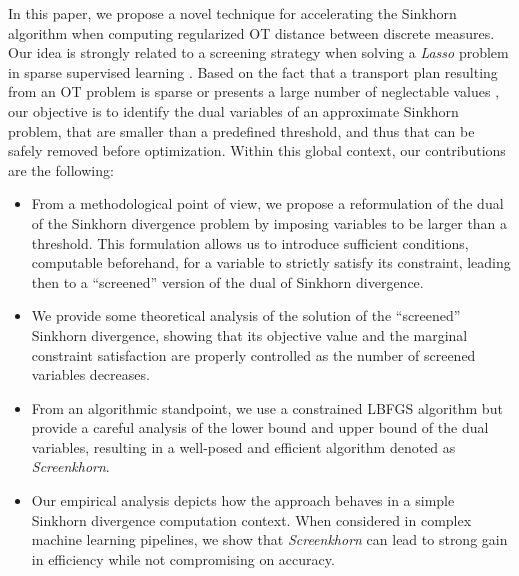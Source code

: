 {In this paper, we propose a novel technique for accelerating the Sinkhorn algorithm when computing regularized OT distance between discrete measures. Our idea
is strongly related to a screening strategy when solving a \emph{Lasso}
problem in sparse supervised learning \citep{Ghaoui2010SafeFE}. Based on the fact
that a  transport plan resulting from an OT problem is sparse or presents a large
number of neglectable values \citep{blondel2018ICML}, our objective is to identify the  dual variables of an approximate Sinkhorn problem, that are smaller than a predefined threshold, and thus that can be safely removed before optimization.  
Within this global context, our contributions are the following:
\begin{itemize}
	  \setlength\itemsep{-0.1cm}
	
	\item From a methodological point of view, we propose a reformulation of the dual of the Sinkhorn divergence problem by imposing variables to be larger than a threshold.
	This formulation allows us to introduce sufficient conditions, computable beforehand, for a variable to  strictly satisfy its constraint, leading then to
	a ``screened'' version of the dual of Sinkhorn divergence. 
	\item We provide some theoretical analysis of the solution of the ``screened''  Sinkhorn divergence, showing that its objective value and the marginal constraint satisfaction are properly controlled 	as the number of screened variables decreases.
	\item From an algorithmic standpoint, we use a constrained LBFGS algorithm \citep{nocedal1980,byrd1995L-BFGS-B} but provide a careful analysis of the lower bound and upper bound of the dual	variables, resulting in a well-posed and efficient algorithm denoted as \emph{Screenkhorn}.
	\item Our empirical analysis depicts how the approach behaves in a simple Sinkhorn divergence computation context. When considered in  complex machine learning
	pipelines, we show that \emph{Screenkhorn} can lead to strong gain in efficiency
	while not compromising on accuracy.
\end{itemize}}
%	
%

